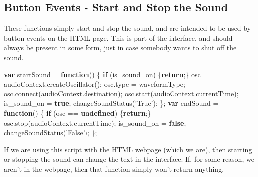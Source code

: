 \documentclass[]{article}
\newenvironment{Shaded}{}{}
\newcommand{\KeywordTok}[1]{\textcolor[rgb]{0.00,0.44,0.13}{\textbf{#1}}}
\newcommand{\StringTok}[1]{\textcolor[rgb]{0.25,0.44,0.63}{#1}}
\newcommand{\VariableTok}[1]{\textcolor[rgb]{0.10,0.09,0.49}{#1}}
\newcommand{\ControlFlowTok}[1]{\textcolor[rgb]{0.00,0.44,0.13}{\textbf{#1}}}
\newcommand{\OperatorTok}[1]{\textcolor[rgb]{0.40,0.40,0.40}{#1}}
\newcommand{\AttributeTok}[1]{\textcolor[rgb]{0.49,0.56,0.16}{#1}}
\newcommand{\NormalTok}[1]{#1}
\begin{document}
\subsection{Button Events - Start and Stop the
Sound}\label{button-events---start-and-stop-the-sound}

These functions simply start and stop the sound, and are intended to be
used by button events on the HTML page. This is part of the interface,
and should always be present in some form, just in case somebody wants
to shut off the sound.

\begin{Shaded}
\begin{Highlighting}[]
\KeywordTok{var}\NormalTok{ startSound }\OperatorTok{=} \KeywordTok{function}\NormalTok{() }\OperatorTok{\{}
    \ControlFlowTok{if}\NormalTok{ (is_sound_on) }\OperatorTok{\{}\ControlFlowTok{return}\OperatorTok{;\}}
\NormalTok{    osc }\OperatorTok{=} \VariableTok{audioContext}\NormalTok{.}\AttributeTok{createOscillator}\NormalTok{()}\OperatorTok{;}
    \VariableTok{osc}\NormalTok{.}\AttributeTok{type} \OperatorTok{=}\NormalTok{ waveformType}\OperatorTok{;}
    \VariableTok{osc}\NormalTok{.}\AttributeTok{connect}\NormalTok{(}\VariableTok{audioContext}\NormalTok{.}\AttributeTok{destination}\NormalTok{)}\OperatorTok{;}
    \VariableTok{osc}\NormalTok{.}\AttributeTok{start}\NormalTok{(}\VariableTok{audioContext}\NormalTok{.}\AttributeTok{currentTime}\NormalTok{)}\OperatorTok{;}
\NormalTok{    is_sound_on }\OperatorTok{=} \KeywordTok{true}\OperatorTok{;}
    \AttributeTok{changeSoundStatus}\NormalTok{(}\StringTok{'True'}\NormalTok{)}\OperatorTok{;}
\OperatorTok{\};}
\KeywordTok{var}\NormalTok{ endSound }\OperatorTok{=} \KeywordTok{function}\NormalTok{() }\OperatorTok{\{}
    \ControlFlowTok{if}\NormalTok{ (osc }\OperatorTok{==} \KeywordTok{undefined}\NormalTok{) }\OperatorTok{\{}\ControlFlowTok{return}\OperatorTok{;\}}
    \VariableTok{osc}\NormalTok{.}\AttributeTok{stop}\NormalTok{(}\VariableTok{audioContext}\NormalTok{.}\AttributeTok{currentTime}\NormalTok{)}\OperatorTok{;}
\NormalTok{    is_sound_on }\OperatorTok{=} \KeywordTok{false}\OperatorTok{;}
    \AttributeTok{changeSoundStatus}\NormalTok{(}\StringTok{'False'}\NormalTok{)}\OperatorTok{;}
\OperatorTok{\};}
\end{Highlighting}
\end{Shaded}

If we are using this script with the HTML webpage (which we are), then
starting or stopping the sound can change the text in the interface. If,
for some reason, we aren't in the webpage, then that function simply
won't return anything.
\end{document}
